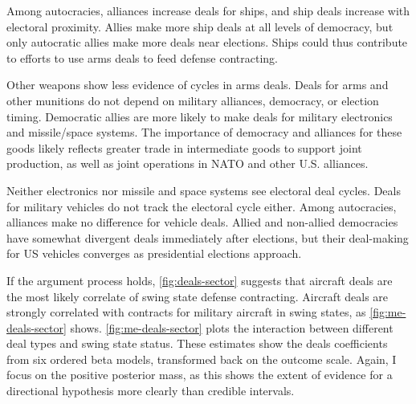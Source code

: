 \documentclass[12pt]{article}
\begin{document}
Among autocracies, alliances increase deals for ships, and ship deals increase with electoral proximity. 
Allies make more ship deals at all levels of democracy, but only autocratic allies make more deals near elections. 
Ships could thus contribute to efforts to use arms deals to feed defense contracting. 


Other weapons show less evidence of cycles in arms deals. 
Deals for arms and other munitions do not depend on military alliances, democracy, or election timing. 
Democratic allies are more likely to make deals for military electronics and missile/space systems. 
The importance of democracy and alliances for these goods likely reflects greater trade in intermediate goods to support joint production, as well as joint operations in NATO and other U.S. alliances. 


Neither electronics nor missile and space systems see electoral deal cycles.
Deals for military vehicles do not track the electoral cycle either. 
Among autocracies, alliances make no difference for vehicle deals. 
Allied and non-allied democracies have somewhat divergent deals immediately after elections, but their deal-making for US vehicles converges as presidential elections approach.


If the argument process holds, \autoref{fig:deals-sector} suggests that aircraft deals are the most likely correlate of swing state defense contracting. 
Aircraft deals are strongly correlated with contracts for military aircraft in swing states, as \autoref{fig:me-deals-sector} shows. 
\autoref{fig:me-deals-sector} plots the interaction between different deal types and swing state status.  
These estimates show the deals coefficients from six ordered beta models, transformed back on the outcome scale. 
Again, I focus on the positive posterior mass, as this shows the extent of evidence for a directional hypothesis more clearly than credible intervals.
\end{document}
